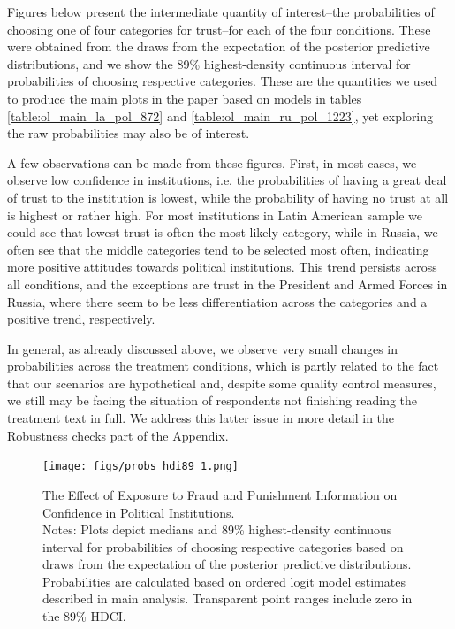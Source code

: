\documentclass[11pt, ngerman,english,a4]{article}
\begin{document}


\clearpage






\newpage




\clearpage

Figures below present the intermediate quantity of interest--the probabilities of choosing one of four categories for trust--for each of the four conditions. These were obtained from the  draws from the expectation of the posterior predictive distributions, and we show the 89\% highest-density continuous interval for probabilities of choosing respective categories. These are the quantities we used to produce the main plots in the paper based on models in tables \ref{table:ol_main_la_pol_872} and \ref{table:ol_main_ru_pol_1223}, yet exploring the raw probabilities may also be of interest. 

A few observations can be made from these figures. First, in most cases, we observe low confidence in institutions, i.e. the probabilities of having a great deal of trust to the institution is lowest, while the probability of having no trust at all is highest or rather high. For most institutions in Latin American sample we could see that lowest trust is often the most likely category, while in Russia, we often see that the middle categories tend to be selected most often, indicating more positive attitudes towards political institutions. This trend persists across all conditions, and the exceptions are trust in the President and Armed Forces in Russia, where there seem to be less differentiation across the categories and a positive trend, respectively.

In general, as already discussed above, we observe very small changes in probabilities across the treatment conditions, which is partly related to the fact that our scenarios are hypothetical and, despite some quality control measures, we still may be facing the situation of respondents not finishing reading the treatment text in full. We address this latter issue in more detail in the Robustness checks part of the Appendix. 

\begin{figure}[H]
	\centering
	\texttt{[image: figs/probs\_hdi89\_1.png]}
	\caption{The Effect of Exposure to Fraud and Punishment Information on Confidence in Political Institutions.  \\
		\footnotesize{Notes: Plots depict medians and 89\% highest-density continuous interval for probabilities of choosing respective categories based on draws from the expectation of the posterior predictive distributions. Probabilities are calculated based on ordered logit model estimates described in main analysis.
			Transparent point ranges include zero in the 89\% HDCI.
	} }
	\singlespacing
	\raggedright
	
\end{figure}
    
\end{document}
